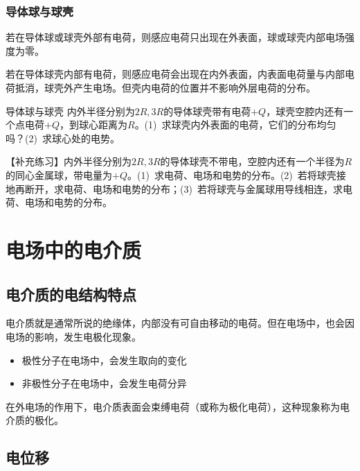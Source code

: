 \subsubsection{导体球与球壳}

若在导体球或球壳外部有电荷，则感应电荷只出现在外表面，球或球壳内部电场强度为零。

若在导体球壳内部有电荷，则感应电荷会出现在内外表面，内表面电荷量与内部电荷抵消，球壳外产生电场。但壳内电荷的位置并不影响外层电荷的分布。


\begin{example}{导体球与球壳}
    内外半径分别为$2R,3R$的导体球壳带有电荷$+Q$，球壳空腔内还有一个点电荷$+Q$，到球心距离为$R$。(1)~求球壳内外表面的电荷，它们的分布均匀吗？(2)~求球心处的电势。

    【补充练习】内外半径分别为$2R,3R$的导体球壳不带电，空腔内还有一个半径为$R$的同心金属球，带电量为$+Q$。(1)~求电荷、电场和电势的分布。(2)~若将球壳接地再断开，求电荷、电场和电势的分布；(3)~若将球壳与金属球用导线相连，求电荷、电场和电势的分布。
\end{example}

\section{电场中的电介质}

\subsection{电介质的电结构特点}

电介质就是通常所说的绝缘体，内部没有可自由移动的电荷。但在电场中，也会因电场的影响，发生电极化现象。

\begin{itemize}
    \item 极性分子在电场中，会发生取向的变化
    \item 非极性分子在电场中，会发生电荷分异
\end{itemize}

在外电场的作用下，电介质表面会束缚电荷（或称为极化电荷），这种现象称为电介质的极化。


\subsection{电位移}

